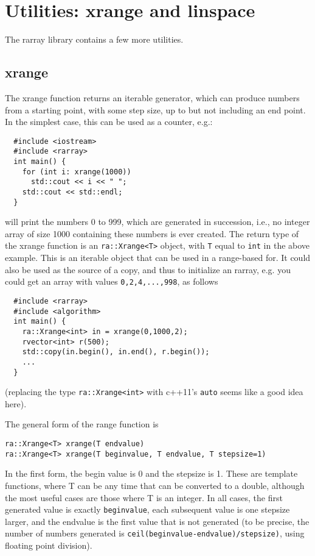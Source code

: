 \documentclass[11pt,twoside]{article}
\begin{document}
\section{Utilities: xrange and linspace}

The rarray library contains a few more utilities.

\subsection{xrange}

The xrange function returns an iterable generator, which can produce
numbers from a starting point, with some step size, up to but not
including an end point.  In the simplest case, this can be used as a
counter, e.g.:
\begin{verbatim}
  #include <iostream>
  #include <rarray>
  int main() {
    for (int i: xrange(1000))
      std::cout << i << " ";
    std::cout << std::endl;
  }
\end{verbatim}
will print the numbers 0 to 999, which are generated in succession,
i.e., no integer array of size 1000 containing these numbers is ever
created. The return type of the xrange function is an
\texttt{ra::Xrange<T>} object, with \texttt{T} equal to \texttt{int}
in the above example.  This is an iterable object that can be used in
a range-based for.  It could also be used as the source of a copy, and
thus to initialize an rarray, e.g. you could get an array with values
\texttt{0,2,4,...,998}, as follows
\begin{verbatim}
  #include <rarray>
  #include <algorithm>
  int main() {
    ra::Xrange<int> in = xrange(0,1000,2);
    rvector<int> r(500);
    std::copy(in.begin(), in.end(), r.begin());
    ...
  }
\end{verbatim}
(replacing the type \texttt{ra::Xrange<int>} with c++11's
\texttt{auto} seems like a good idea here).

The general form of the range function is
\begin{verbatim}
ra::Xrange<T> xrange(T endvalue)
ra::Xrange<T> xrange(T beginvalue, T endvalue, T stepsize=1)
\end{verbatim}
In the first form, the begin value is 0 and the stepsize is 1. These
are template functions, where T can be any time that can be converted
to a double, although the most useful cases are those where T is an
integer.  In all cases, the first generated value is exactly
\texttt{beginvalue}, each subsequent value is one stepsize larger, and
the endvalue is the first value that is not generated (to be precise,
the number of numbers generated is
\texttt{ceil(beginvalue-endvalue)/stepsize)}, using floating point
division).
\end{document}
